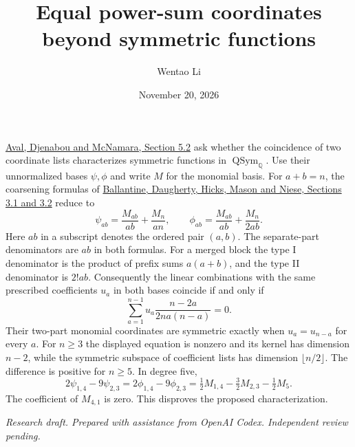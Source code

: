 \documentclass[11pt]{article}
\title{Equal power-sum coordinates beyond symmetric functions}
\author{Wentao Li}
\date{November 20, 2026}
\newcommand{\Q}{\mathbb Q}
\DeclareMathOperator{\QSym}{QSym}
\begin{document}
\maketitle

\href{https://doi.org/10.5802/alco.273}{Aval, Djenabou and McNamara, Section 5.2} ask whether the coincidence of two coordinate lists characterizes symmetric functions in $\QSym_{\Q}$. Use their unnormalized bases $\psi,\phi$ and write $M$ for the monomial basis. For $a+b=n$, the coarsening formulas of \href{https://arxiv.org/abs/1710.11613}{Ballantine, Daugherty, Hicks, Mason and Niese, Sections 3.1 and 3.2} reduce to
\[
 \psi_{ab}=\frac{M_{ab}}{ab}+\frac{M_n}{an},
 \qquad \phi_{ab}=\frac{M_{ab}}{ab}+\frac{M_n}{2ab}.
\]
Here $ab$ in a subscript denotes the ordered pair $(a,b)$. The separate-part denominators are $ab$ in both formulas. For a merged block the type I denominator is the product of prefix sums $a(a+b)$, and the type II denominator is $2!ab$.
Consequently the linear combinations with the same prescribed coefficients $u_a$ in both bases coincide if and only if
\[
 \sum_{a=1}^{n-1} u_a\frac{n-2a}{2na(n-a)}=0.
\]
Their two-part monomial coordinates are symmetric exactly when $u_a=u_{n-a}$ for every $a$. For $n\ge3$ the displayed equation is nonzero and its kernel has dimension $n-2$, while the symmetric subspace of coefficient lists has dimension $\lfloor n/2\rfloor$. The difference is positive for $n\ge5$. In degree five,
\[
 2\psi_{1,4}-9\psi_{2,3}=2\phi_{1,4}-9\phi_{2,3}
 =\tfrac12 M_{1,4}-\tfrac32 M_{2,3}-\tfrac12 M_5.
\]
The coefficient of $M_{4,1}$ is zero. This disproves the proposed characterization.

\medskip\noindent\textit{Research draft. Prepared with assistance from OpenAI Codex. Independent review pending.}
\end{document}
